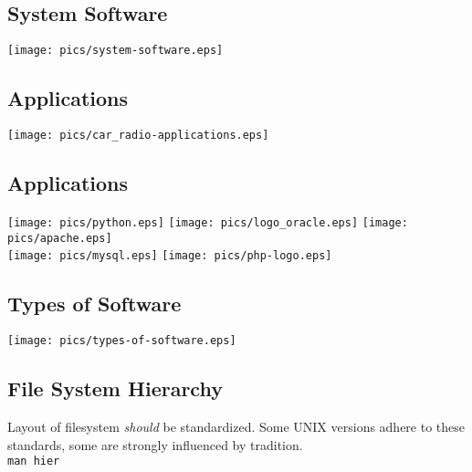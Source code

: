 \documentclass[xga]{xdvislides}
\begin{document}
\subsection{System Software}
\begin{center}
	\texttt{[image: pics/system-software.eps]}
\end{center}

\subsection{Applications}
\begin{center}
	\texttt{[image: pics/car\_radio-applications.eps]}
\end{center}

\subsection{Applications}
\begin{center}
	\texttt{[image: pics/python.eps]}
	\texttt{[image: pics/logo\_oracle.eps]}
	\texttt{[image: pics/apache.eps]} \\
	\texttt{[image: pics/mysql.eps]}
	\texttt{[image: pics/php-logo.eps]}
\end{center}

\subsection{Types of Software}
\vfill
\begin{center}
	\texttt{[image: pics/types-of-software.eps]}
\end{center}
\vfill

\subsection{File System Hierarchy}
Layout of filesystem {\em should} be standardized.  Some UNIX versions adhere
to these standards, some are strongly influenced by tradition.
\\

{\tt man hier}
\end{document}

